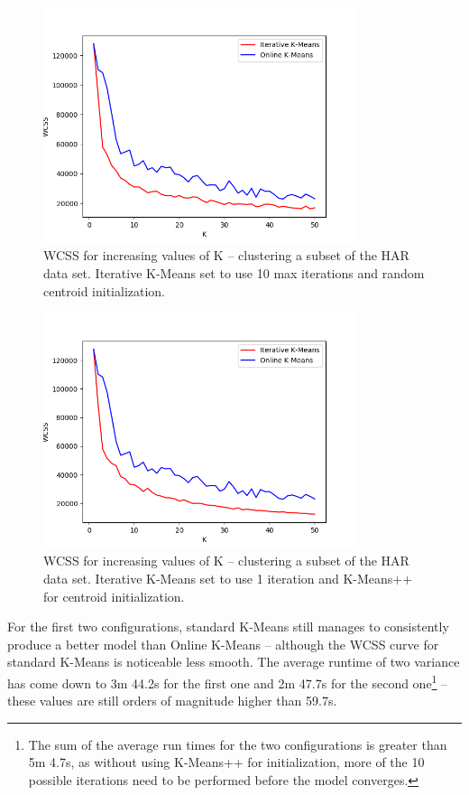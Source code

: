\documentclass{l4proj}
\begin{document}
\begin{figure}[H]
	\centering
    \label{fig:res3}
    \includegraphics[width=0.82\textwidth]{images/result3}
    \caption{WCSS for increasing values of K -- clustering a subset of the HAR data set. Iterative K-Means set to use 10 max iterations and random centroid initialization. } 
\end{figure}

\begin{figure}[H]
	\centering
    \label{fig:res4}
    \includegraphics[width=0.82\textwidth]{images/result4}
    \caption{WCSS for increasing values of K -- clustering a subset of the HAR data set. Iterative K-Means set to use 1 iteration and K-Means++ for centroid initialization. } 
\end{figure}

For the first two configurations, standard K-Means still manages to consistently produce a better model than Online K-Means -- although the WCSS curve for standard K-Means is noticeable less smooth. The average runtime of two variance has come down to  3m 44.2s for the first one and 2m 47.7s for the second one\footnote{The sum of the average run times for the two configurations is greater than 5m 4.7s, as without using K-Means++ for initialization, more of the 10 possible iterations need to be performed before the model converges.} -- these values are still orders of magnitude higher than 59.7s.
\end{document}
